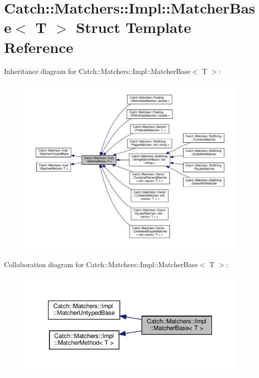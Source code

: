 \hypertarget{structCatch_1_1Matchers_1_1Impl_1_1MatcherBase}{}\section{Catch\+::Matchers\+::Impl\+::Matcher\+Base$<$ T $>$ Struct Template Reference}
\label{structCatch_1_1Matchers_1_1Impl_1_1MatcherBase}


Inheritance diagram for Catch\+::Matchers\+::Impl\+::Matcher\+Base$<$ T $>$\+:\nopagebreak
\begin{figure}[H]
\begin{center}
\leavevmode
\includegraphics[width=350pt]{structCatch_1_1Matchers_1_1Impl_1_1MatcherBase__inherit__graph}
\end{center}
\end{figure}


Collaboration diagram for Catch\+::Matchers\+::Impl\+::Matcher\+Base$<$ T $>$\+:\nopagebreak
\begin{figure}[H]
\begin{center}
\leavevmode
\includegraphics[width=347pt]{structCatch_1_1Matchers_1_1Impl_1_1MatcherBase__coll__graph}
\end{center}
\end{figure}
